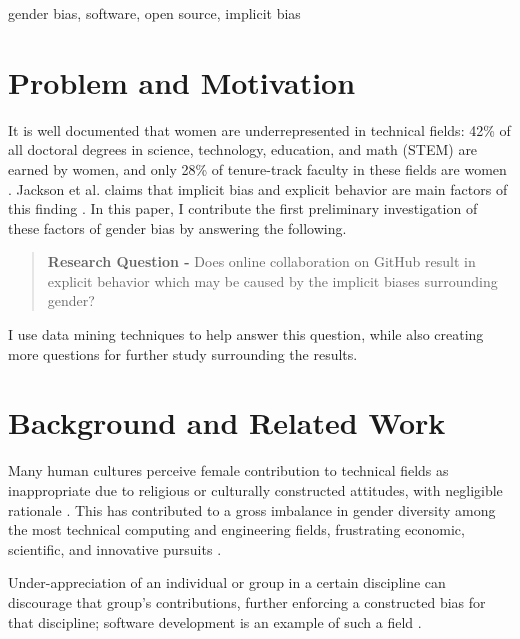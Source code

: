 \documentclass[10pt]{sigplanconf}
\begin{document}

\keywords
gender bias, software, open source, implicit bias

\section{Problem and Motivation}

It is well documented that women are underrepresented in technical fields:
42\% of all doctoral degrees in science, technology, education, and
math (STEM) are earned by women, and only 28\% of tenure-track faculty in these
fields are women \cite{womenengineering}. Jackson et al. claims that implicit
bias and explicit behavior are main
factors of this finding \citep{implicitbias}. In this paper, I
contribute the first preliminary investigation of these factors of gender bias
by answering the following.

\begin{quote}
  \textbf{Research Question -} Does online collaboration on GitHub result in
  explicit behavior which may be caused by the implicit biases surrounding
  gender?
\end{quote}

I use data mining techniques to help answer this question, while also creating
more questions for further study surrounding the results.

\section{Background and Related Work}

Many human cultures perceive female contribution to technical
fields as inappropriate due to religious or culturally constructed attitudes, with
negligible rationale \citep{elamin2010saudiwomen}. This has contributed to a gross imbalance in gender diversity among
the most technical computing and engineering fields, frustrating economic,
scientific, and innovative pursuits \citep{genderscience}.


Under-appreciation of an individual or group in a certain
discipline can discourage that group's contributions, further enforcing a
constructed bias for that discipline; software development is an example of such
a field \citep{genderscience}.
\end{document}
